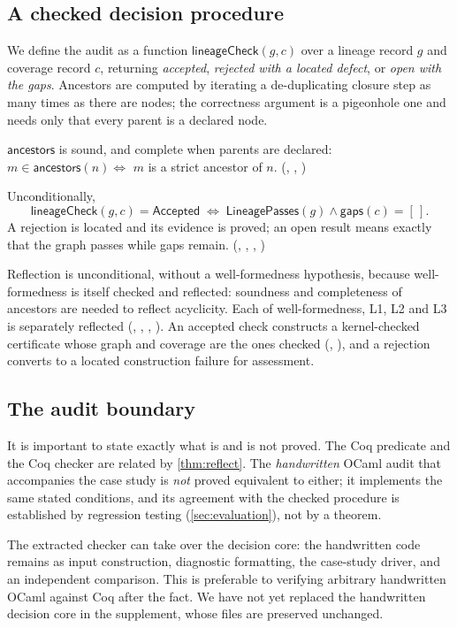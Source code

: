 \subsection{A checked decision procedure}
We define the audit as a function $\mathsf{lineageCheck}(g,c)$ over a lineage record $g$ and coverage record $c$, returning \emph{accepted}, \emph{rejected with a located defect}, or \emph{open with the gaps}. Ancestors are computed by iterating a de-duplicating closure step as many times as there are nodes; the correctness argument is a pigeonhole one and needs only that every parent is a declared node.
\begin{theorem}\label{thm:anc}
$\mathsf{ancestors}$ is sound, and complete when parents are declared: $m \in \mathsf{ancestors}(n) \Longleftrightarrow$ $m$ is a strict ancestor of $n$. (, , )
\end{theorem}
\begin{theorem}\label{thm:reflect}
Unconditionally,
\[
\mathsf{lineageCheck}(g,c) = \mathsf{Accepted} \;\Longleftrightarrow\; \mathsf{LineagePasses}(g) \wedge \mathsf{gaps}(c) = [\,].
\]
A rejection is located and its evidence is proved; an open result means exactly that the graph passes while gaps remain. (, , , )
\end{theorem}
Reflection is unconditional, without a well-formedness hypothesis, because well-formedness is itself checked and reflected: soundness and completeness of ancestors are needed to reflect acyclicity. Each of well-formedness, L1, L2 and L3 is separately reflected (, , , ). An accepted check constructs a kernel-checked certificate whose graph and coverage are the ones checked (, ), and a rejection converts to a located construction failure for assessment.

\subsection{The audit boundary}
It is important to state exactly what is and is not proved. The Coq predicate and the Coq checker are related by \cref{thm:reflect}. The \emph{handwritten} OCaml audit that accompanies the case study is \emph{not} proved equivalent to either; it implements the same stated conditions, and its agreement with the checked procedure is established by regression testing (\cref{sec:evaluation}), not by a theorem.

The extracted checker can take over the decision core: the handwritten code remains as input construction, diagnostic formatting, the case-study driver, and an independent comparison. This is preferable to verifying arbitrary handwritten OCaml against Coq after the fact. We have not yet replaced the handwritten decision core in the supplement, whose files are preserved unchanged.
